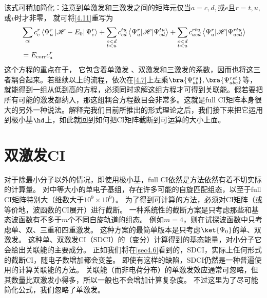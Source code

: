 该式可稍加简化：注意到单激发和三激发之间的矩阵元仅当$a=c,d,$或$e$且$r=t,u,$或$v$时才非零，
就可将\autoref{4.11}重写为
\begin{align}
&\sum_{c t} c_{c}^{r}\left\langle\Psi_{a}^{r}\left|\mathscr{H}-E_{0}\right| \Psi_{c}^{r}\right\rangle+\sum_{\substack{c<d \\ t<u}} c_{cd}^{tu}\left\langle\Psi_{a}^{r}|\mathscr{H}| \Psi_{c d}^{tu}\right\rangle+\sum_{\substack{c<d\\ t<u}} c_{acd}^{rtu}\left\langle\Psi_{a}^{r}|\mathscr{H}| \Psi_{acd}^{rtu}\right\rangle \notag \\
&=E_{\mathrm{corr}} c_{a}^{r}
\label{4.12}
\end{align}
这个方程的重点在于，
它包含着单激发
、双激发和三激发的系数，因而也将这三者耦合起来。若继续以上的流程，依次在\autoref{4.7}上左乘$\bra{\Psi_{ab}^{rs}},\bra{\Psi_{abc}^{rst}}$等，就能得到一组从低到高的方程，必须同时求解这组方程才可得到关联能。假若要把所有可能的激发都纳入，那这组耦合方程数目会非常多。这就是full CI矩阵本身很大的另外一种说法。解释完我们目前所推出的形式理论之后，我们接下来把它运用到极小基$\hd$上，如此就回到如何把CI矩阵截断到可运算的大小上面。





















\section{双激发CI}\mbox{}
\label{sec4.2}
对于除最小分子以外的情况，即使用极小基，full CI依然是方法依然有着不切实际的计算量。
对中等大小的单电子基组，存在许多可能的自旋匹配组态，以至于full CI矩阵特别大（维数大于$10^9\times 10^9$）。
为了得到可计算的方法，必须对CI矩阵（或等价地，波函数的CI展开）进行截断。
一种系统性的截断方案是只考虑那些和\hft 基态波函数有不多于$m$个不同自旋轨道的组态。
例如$m=4$，则在试探波函数中只考虑单、双、三重和四重激发。
这种方案的最简单版本是只考虑$\ket{\Psi_0}$的单、双激发。
这种单、双激发CI（SDCI）的（变分）计算得到的基态能量，对小分子它会给出关联能的主要成分。
正如我们将在\autoref{sec4.6}看到的，SDCI，实际上任何形式的截断CI，随电子数增加都会变差。
即使有这样的缺陷，SDCI仍然是一种普遍使用的计算关联能的方法。
关联能（而非电荷分布）的单激发效应通常可忽略，但其数量比双激发小得多，所以一般也不会增加计算复杂度。
不过这里为了尽可能简化公式，我们忽略了单激发。

